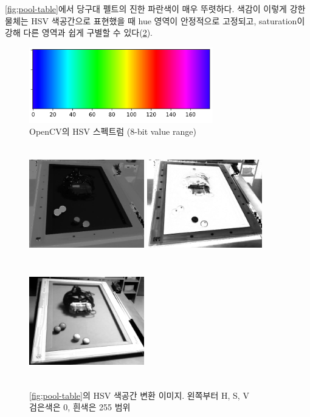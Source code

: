 \documentclass[10pt]{oblivoir}
\begin{document}
\cref{fig;pool-table}에서 당구대 펠트의 진한 파란색이 매우 뚜렷하다. 색감이 이렇게 강한 물체는 HSV 색공간으로 표현했을 때  hue 영역이 안정적으로 고정되고, saturation이 강해 다른 영역과 쉽게 구별할 수 있다(\cref{fig;pool-table-hs}).

\begin{figure}[ht]
    \centering
    \includegraphics[width=8cm]{img/hsv-spectrum.png}
    \caption{OpenCV의 HSV 스펙트럼 (8-bit value range)}
    \label{fig;hsv-spectrum}
\end{figure}

\begin{figure}[ht]
    \begin{center}
        \includegraphics[width=5cm, height=5cm, keepaspectratio]{img/billiards-table-h-shift.png}
        \includegraphics[width=5cm, height=5cm, keepaspectratio]{img/billiards-table-s.png}
        \includegraphics[width=5cm, height=5cm, keepaspectratio]{img/billiards-table-v.png}
    \end{center}
    \caption[Caption for LOF]{\cref{fig;pool-table}의 HSV 색공간 변환 이미지. 왼쪽부터 H\footnotemark, S, V \\ 검은색은 0, 흰색은 255 범위}
    \label{fig;pool-table-hs}
\end{figure}
\end{document}
